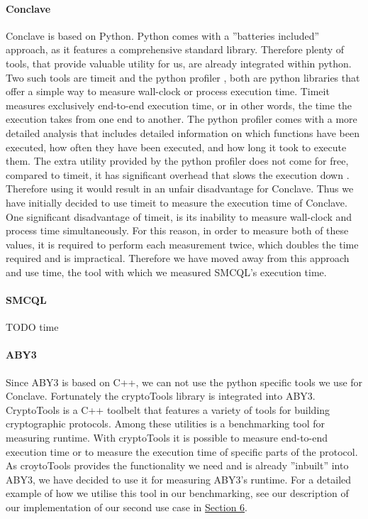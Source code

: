 \paragraph{Conclave}
Conclave is based on Python. Python comes with a ''batteries included'' approach, as it features a comprehensive standard library. Therefore plenty of tools, that provide valuable utility for us, are already integrated within python. Two such tools are timeit \cite{time} and the python profiler \cite{cProfile}, both are python libraries that offer a simple way to measure wall-clock or process execution time. Timeit measures exclusively end-to-end execution time, or in other words, the time the execution takes from one end to another. The python profiler comes with a more detailed analysis that includes detailed information on which functions have been executed, how often they have been executed, and how long it took to execute them. The extra utility provided by the python profiler does not come for free, compared to timeit, it has significant overhead that slows the execution down \cite{cProfile}. Therefore using it would result in an unfair disadvantage for Conclave. Thus we have initially decided to use timeit to measure the execution time of Conclave. One significant disadvantage of timeit, is its inability to measure wall-clock and process time simultaneously. For this reason, in order to measure both of these values, it is required to perform each measurement twice, which doubles the time required and is impractical. Therefore we have moved away from this approach and use time, the tool with which we measured SMCQL's execution time.  
\paragraph{SMCQL}

TODO time \cite{time_sh}
\paragraph{ABY3}
Since ABY3 is based on C++, we can not use the python specific tools we use for Conclave. Fortunately the cryptoTools library \cite{cryotoTools} is integrated into ABY3. CryptoTools is a C++ toolbelt that features a variety of tools for building cryptographic protocols. Among these utilities is a benchmarking tool for measuring runtime. With cryptoTools it is possible to measure end-to-end execution time or to measure the execution time of specific parts of the protocol. As croytoTools provides the functionality we need and is already ''inbuilt'' into ABY3, we have decided to use it for measuring ABY3's runtime. For a detailed example of how we utilise this tool in our benchmarking, see our description of our implementation of our second use case in \hyperref[Implemetation]{Section 6}.




